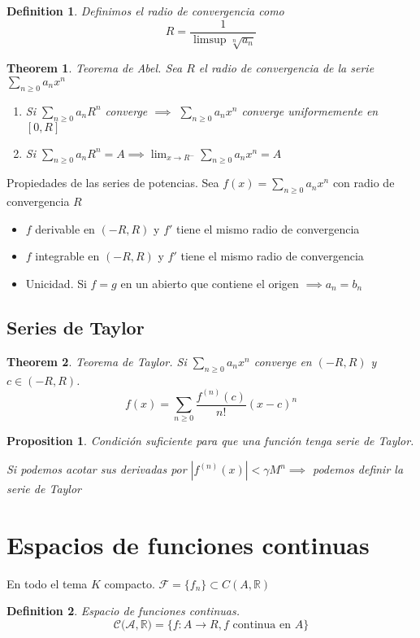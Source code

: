 \documentclass[leqno]{article}
\newtheorem*{definition}{Definition}
\newtheorem*{theorem}{Theorem}
\newtheorem*{proposition}{Proposition}
\begin{document}
\begin{definition}
Definimos el radio de convergencia como
\[
R = \frac{1}{\limsup \sqrt[n]{a_n} }
\] 
\end{definition}

\begin{theorem}
Teorema de Abel. Sea $R$ el radio de convergencia de la serie  $\sum_{n\ge 0} a_nx^n$
\begin{enumerate}[topsep=0pt, itemsep=0pt]
  \item Si $\sum_{n\ge 0} a_nR^n$ converge $\implies$ $\sum_{n\ge 0} a_nx^n$ converge uniformemente en $[0, R]$
  \item Si  $\sum_{n\ge 0} a_nR^n=A \implies \lim_{x\to R^-} \sum_{n\ge 0} a_nx^n = A$  
\end{enumerate}
\end{theorem}

Propiedades de las series de potencias. Sea $f(x) = \sum_{n\ge 0} a_nx^n$ con radio de convergencia $R$
 \begin{itemize}[topsep=0pt, itemsep=0pt]
  \item $f$ derivable en  $(-R, R)$ y $f'$ tiene el mismo radio de convergencia
  \item $f$ integrable en  $(-R, R)$ y $f'$ tiene el mismo radio de convergencia
  \item Unicidad. Si $f=g$ en un abierto que contiene el origen $ \implies a_n = b_n$
\end{itemize}

\subsection{Series de Taylor}
\begin{theorem}
Teorema de Taylor. Si $\sum_{n\ge 0} a_nx^n$ converge en $(-R, R)$ y  $c\in (-R, R)$.
\[
f(x) = \sum_{n\ge 0} \frac{f^{(n)}(c)}{n!}(x-c)^n
\] 
\end{theorem}

\begin{proposition}
Condición suficiente para que una función tenga serie de Taylor.

Si podemos acotar sus derivadas por $|f^{(n)}(x)|<\gamma M^n \implies$ podemos definir la serie de Taylor 
\end{proposition}

\section{Espacios de funciones continuas}
En todo el tema $K$ compacto. $\mathcal{F} = \{f_n\}\subset C(A, \mathbb{R})$
\begin{definition}
Espacio de funciones continuas.
\[
\mathcal{C(A, \mathbb{R}} ) = \{f:A\to R, f \text{ continua en }A\}
\] 
\end{definition}
\end{document}

